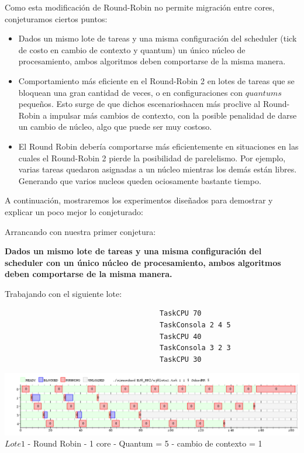 \indent \indent Como esta modificación de Round-Robin no permite migración entre cores, 
conjeturamos ciertos puntos:\\
\begin{itemize}
 \item Dados un mismo lote de tareas y una misma configuración del scheduler (tick de costo en cambio de contexto y quantum)
 un único núcleo de procesamiento,  ambos algoritmos deben comportarse de la misma manera. 
  \item Comportamiento más eficiente en el Round-Robin 2 en lotes de tareas que se bloquean una gran cantidad de veces, o  en configuraciones con $quantums$ pequeños. 
  Esto surge de que dichos escenarioshacen más proclive al Round-Robin a impulsar más cambios de contexto, 
  con la posible penalidad de darse un cambio de núcleo, algo que puede ser muy costoso.
  \item El Round Robin debería comportarse más eficientemente en situaciones en las cuales el Round-Robin 2 pierde la posibilidad de parelelismo. 
  Por ejemplo, varias tareas quedaron asignadas a un núcleo mientras los demás están libres. Generando que varios nucleos queden ociosamente bastante tiempo.
  
 \end{itemize}

 \indent A continuación, mostraremos los experimentos diseñados para demostrar y explicar un poco mejor lo conjeturado:
 
 \indent Arrancando con nuestra primer conjetura:
 
 \begin{center}
  \textbf{Dados un mismo lote de tareas y una misma configuración del scheduler con un único núcleo de procesamiento, 
 ambos algoritmos deben comportarse de la misma manera. }
 \end{center}

 
 \indent Trabajando con el siguiente lote:
 
 \begin{verbatim}
                                     TaskCPU 70
                                     TaskConsola 2 4 5
                                     TaskCPU 40
                                     TaskConsola 3 2 3
                                     TaskCPU 30
 \end{verbatim}

  \begin{center}
    	\includegraphics[width=450pt]{./EJ8_RR2/dif1corerr.png}
	{$Lote 1$ - Round Robin - 1 core - Quantum = 5 - cambio de contexto = 1}	
 \end{center}
 
